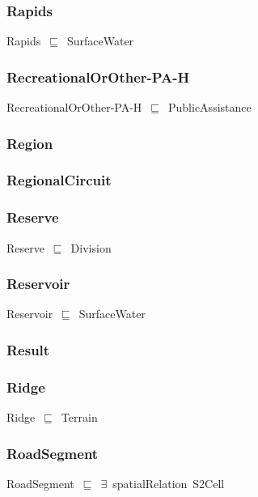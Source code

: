 \documentclass{article}
\begin{document}
\subsubsection*{Rapids}

Rapids~\ensuremath{\sqsubseteq}~SurfaceWater~

\subsubsection*{RecreationalOrOther-PA-H}

RecreationalOrOther-PA-H~\ensuremath{\sqsubseteq}~PublicAssistance~

\subsubsection*{Region}

\subsubsection*{RegionalCircuit}

\subsubsection*{Reserve}

Reserve~\ensuremath{\sqsubseteq}~Division~

\subsubsection*{Reservoir}

Reservoir~\ensuremath{\sqsubseteq}~SurfaceWater~

\subsubsection*{Result}

\subsubsection*{Ridge}

Ridge~\ensuremath{\sqsubseteq}~Terrain~

\subsubsection*{RoadSegment}

RoadSegment~\ensuremath{\sqsubseteq}~\ensuremath{\exists}~spatialRelation~S2Cell~
\end{document}
